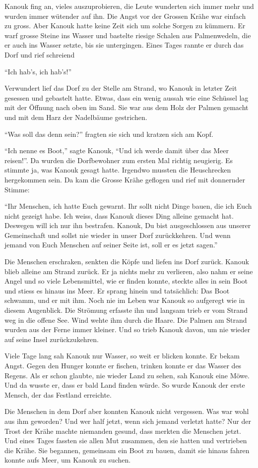 Kanouk fing an, vieles auszuprobieren, die Leute wunderten sich immer mehr und wurden immer wütender auf ihn. Die Angst vor der Grossen Krähe war einfach zu gross. Aber Kanouk hatte keine Zeit sich um solche Sorgen zu kümmern. Er warf grosse Steine ins Wasser und bastelte riesige Schalen aus Palmenwedeln, die er auch ins Wasser setzte, bis sie untergingen. Eines Tages rannte er durch das Dorf und rief schreiend 

\enquote{Ich hab's, ich hab's!}

Verwundert lief das Dorf zu der Stelle am Strand, wo Kanouk in letzter Zeit gesessen und gebastelt hatte. Etwas, dass ein wenig aussah wie eine Schüssel lag mit der Öffnung nach oben im Sand. Sie war aus dem Holz der Palmen gemacht und mit dem Harz der Nadelbäume gestrichen. 

\enquote{Was soll das denn sein?} fragten sie sich und kratzen sich am Kopf. 

\enquote{Ich nenne es Boot,} sagte Kanouk, \enquote{Und ich werde damit über das Meer reisen!}. Da wurden die Dorfbewohner zum ersten Mal richtig neugierig. Es stimmte ja, was Kanouk gesagt hatte. Irgendwo mussten die Heuschrecken hergekommen sein. Da kam die Grosse Krähe geflogen und rief mit donnernder Stimme:

\enquote{Ihr Menschen, ich hatte Euch gewarnt. Ihr sollt nicht Dinge bauen, die ich Euch nicht gezeigt habe. Ich weiss, dass Kanouk dieses Ding alleine gemacht hat. Deswegen will ich nur ihn bestrafen. Kanouk, Du bist ausgeschlossen aus unserer Gemeinschaft und sollst nie wieder in unser Dorf zurückkehren. Und wenn jemand von Euch Menschen auf seiner Seite ist, soll er es jetzt sagen.}

Die Menschen erschraken, senkten die Köpfe und liefen ins Dorf zurück. Kanouk
blieb alleine am Strand zurück. Er ja nichts mehr zu verlieren, also nahm er
seine Angel und so viele Lebensmittel, wie er finden konnte, steckte alles in
sein Boot und stiess es hinaus ins Meer. Er sprang hinein und tatsächlich: Das
Boot schwamm, und er mit ihm. Noch nie im Leben war Kanouk so aufgeregt wie in diesem Augenblick. Die Strömung erfasste ihn und langsam trieb er vom Strand weg in die offene See. Wind wehte ihm durch die Haare. Die Palmen am Strand wurden aus der Ferne immer kleiner. Und so trieb Kanouk davon, um nie wieder auf seine Insel zurückzukehren.

Viele Tage lang sah Kanouk nur Wasser, so weit er blicken konnte. Er bekam
Angst. Gegen den Hunger konnte er fischen, trinken konnte er das Wasser des
Regens. Als er schon glaubte, nie wieder Land zu sehen, sah Kanouk eine Möwe. Und da wusste er, dass er bald Land finden würde. So wurde Kanouk der erste Mensch, der das Festland erreichte.

Die Menschen in dem Dorf aber konnten Kanouk nicht vergessen. Was war wohl aus
ihm geworden? Und wer half jetzt, wenn sich jemand verletzt hatte? Nur der Trost der Krähe machte niemanden gesund, dass merkten die Menschen jetzt. Und eines Tages fassten sie allen Mut zusammen, den sie hatten und vertrieben die Krähe. Sie begannen, gemeinsam ein Boot zu bauen, damit sie hinaus fahren konnte aufs Meer, um Kanouk zu suchen. \hfill {\color{DeepPink}\decofourleft}
